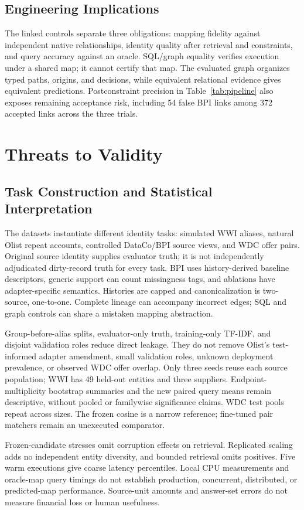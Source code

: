 \documentclass[conference,letterpaper]{IEEEtran}
\begin{document}
\subsection{Engineering Implications}
The linked controls separate three obligations: mapping fidelity against independent native relationships, identity quality after retrieval and constraints, and query accuracy against an oracle. SQL/graph equality verifies execution under a shared map; it cannot certify that map. The evaluated graph organizes typed paths, origins, and decisions, while equivalent relational evidence gives equivalent predictions. Postconstraint precision in Table~\ref{tab:pipeline} also exposes remaining acceptance risk, including 54 false BPI links among 372 accepted links across the three trials.

\section{Threats to Validity}
\label{sec:validity}
\subsection{Task Construction and Statistical Interpretation}
The datasets instantiate different identity tasks: simulated WWI aliases, natural Olist repeat accounts, controlled DataCo/BPI source views, and WDC offer pairs. Original source identity supplies evaluator truth; it is not independently adjudicated dirty-record truth for every task. BPI uses history-derived baseline descriptors, generic support can count missingness tags, and ablations have adapter-specific semantics. Histories are capped and canonicalization is two-source, one-to-one. Complete lineage can accompany incorrect edges; SQL and graph controls can share a mistaken mapping abstraction.

Group-before-alias splits, evaluator-only truth, training-only TF-IDF, and disjoint validation roles reduce direct leakage. They do not remove Olist's test-informed adapter amendment, small validation roles, unknown deployment prevalence, or observed WDC offer overlap. Only three seeds reuse each source population; WWI has 49 held-out entities and three suppliers. Endpoint-multiplicity bootstrap summaries and the new paired query means remain descriptive, without pooled or familywise significance claims. WDC test pools repeat across sizes. The frozen cosine is a narrow reference; fine-tuned pair matchers remain an unexecuted comparator.

Frozen-candidate stresses omit corruption effects on retrieval. Replicated scaling adds no independent entity diversity, and bounded retrieval omits positives. Five warm executions give coarse latency percentiles. Local CPU measurements and oracle-map query timings do not establish production, concurrent, distributed, or predicted-map performance. Source-unit amounts and answer-set errors do not measure financial loss or human usefulness.
\end{document}
